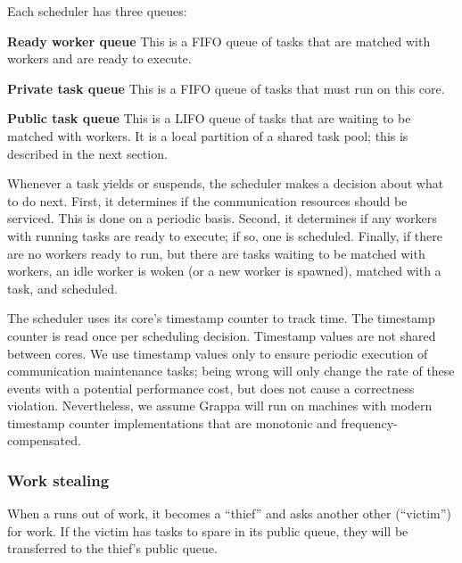 Each scheduler has three queues:
\begin{description}
\item{\bf Ready worker queue} This is a FIFO queue of tasks that are
  matched with workers and are ready to execute.
\item{\bf Private task queue} This is a FIFO queue of tasks that must run on this core.
\item{\bf Public task queue} This is a LIFO queue of tasks that are
  waiting to be matched with workers. It is a local partition of a shared
  task pool; this is described in the next section.
\end{description}


Whenever a task yields or suspends, the scheduler makes a decision
about what to do next. First, it determines if
the communication resources should be serviced. This is done on a
periodic basis. Second, it determines if any workers with running
tasks are ready to execute; if so, one is scheduled. Finally, if there
are no workers ready to run, but there are tasks waiting to be matched
with workers, an idle worker is woken (or a new worker is spawned),
matched with a task, and scheduled.

The scheduler uses its core's timestamp counter to track time. The
timestamp counter is read once per scheduling decision. Timestamp
values are not shared between cores. We use timestamp values only to
ensure periodic execution of communication maintenance tasks; being
wrong will only change the rate of these events with a potential
performance cost, but does not cause a correctness violation. Nevertheless, we
assume Grappa will run on machines with modern timestamp counter
implementations that are monotonic and frequency-compensated.

\subsubsection{Work stealing} \label{subsec:implementation-worksteal}
When a  runs
out of work, it becomes a ``thief'' and asks another other
 (``victim'') for work. If the victim has tasks
to spare in its public queue, they will be transferred to the thief's public queue.

